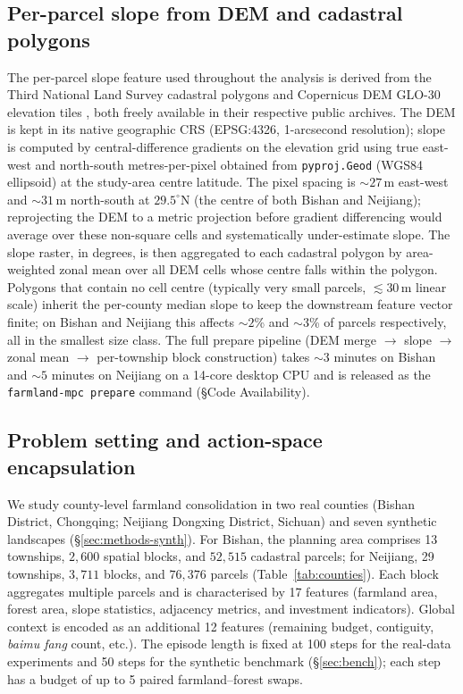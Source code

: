 \documentclass[11pt]{article}
\begin{document}
\subsection*{Per-parcel slope from DEM and cadastral polygons}\label{sec:methods-prepare}

The per-parcel slope feature used throughout the analysis is derived from the Third National Land Survey cadastral polygons and Copernicus DEM GLO-30 elevation tiles \citep{copernicus2021dem}, both freely available in their respective public archives. The DEM is kept in its native geographic CRS (EPSG:4326, 1-arcsecond resolution); slope is computed by central-difference gradients on the elevation grid using true east-west and north-south metres-per-pixel obtained from \texttt{pyproj.Geod} (WGS84 ellipsoid) at the study-area centre latitude. The pixel spacing is $\sim$$27$\,m east-west and $\sim$$31$\,m north-south at $29.5^\circ$N (the centre of both Bishan and Neijiang); reprojecting the DEM to a metric projection before gradient differencing would average over these non-square cells and systematically under-estimate slope. The slope raster, in degrees, is then aggregated to each cadastral polygon by area-weighted zonal mean over all DEM cells whose centre falls within the polygon. Polygons that contain no cell centre (typically very small parcels, $\lesssim 30$\,m linear scale) inherit the per-county median slope to keep the downstream feature vector finite; on Bishan and Neijiang this affects $\sim$$2$\% and $\sim$$3$\% of parcels respectively, all in the smallest size class. The full prepare pipeline (DEM merge $\to$ slope $\to$ zonal mean $\to$ per-township block construction) takes $\sim$$3$ minutes on Bishan and $\sim$$5$ minutes on Neijiang on a 14-core desktop CPU and is released as the \texttt{farmland-mpc prepare} command (\S Code Availability).

\subsection*{Problem setting and action-space encapsulation}\label{sec:methods-action}

We study county-level farmland consolidation in two real counties (Bishan District, Chongqing; Neijiang Dongxing District, Sichuan) and seven synthetic landscapes (\S\ref{sec:methods-synth}). For Bishan, the planning area comprises 13 townships, $2{,}600$ spatial blocks, and $52{,}515$ cadastral parcels; for Neijiang, 29 townships, $3{,}711$ blocks, and $76{,}376$ parcels (Table~\ref{tab:counties}). Each block aggregates multiple parcels and is characterised by 17 features (farmland area, forest area, slope statistics, adjacency metrics, and investment indicators). Global context is encoded as an additional 12 features (remaining budget, contiguity, \textit{baimu fang} count, etc.). The episode length is fixed at 100 steps for the real-data experiments and 50 steps for the synthetic benchmark (\S\ref{sec:bench}); each step has a budget of up to 5 paired farmland--forest swaps.
\end{document}
